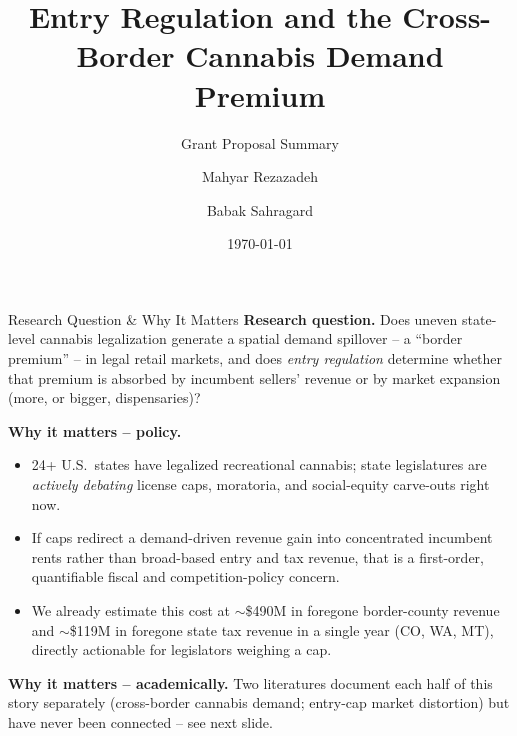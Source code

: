 \documentclass[aspectratio=169,11pt]{beamer}
\title{Entry Regulation and the Cross-Border Cannabis Demand Premium}
\subtitle{Grant Proposal Summary}
\author{Mahyar Rezazadeh \and Babak Sahragard}
\date{\today}
\begin{document}
\begin{frame}{Research Question \& Why It Matters}
\textbf{Research question.} Does uneven state-level cannabis legalization generate a spatial demand spillover
-- a ``border premium'' -- in legal retail markets, and does \emph{entry regulation} determine whether that
premium is absorbed by incumbent sellers' revenue or by market expansion (more, or bigger, dispensaries)?

\vspace{0.5em}
\textbf{Why it matters -- policy.}
\begin{itemize}
\item 24+ U.S.\ states have legalized recreational cannabis; state legislatures are \emph{actively debating}
license caps, moratoria, and social-equity carve-outs right now.
\item If caps redirect a demand-driven revenue gain into concentrated incumbent rents rather than broad-based
entry and tax revenue, that is a first-order, quantifiable fiscal and competition-policy concern.
\item We already estimate this cost at $\sim$\$490M in foregone border-county revenue and $\sim$\$119M in
foregone state tax revenue in a single year (CO, WA, MT), directly actionable for legislators weighing a cap.
\end{itemize}

\vspace{0.3em}
\textbf{Why it matters -- academically.} Two literatures document each half of this story separately
(cross-border cannabis demand; entry-cap market distortion) but have never been connected -- see next slide.
\end{frame}
\end{document}
